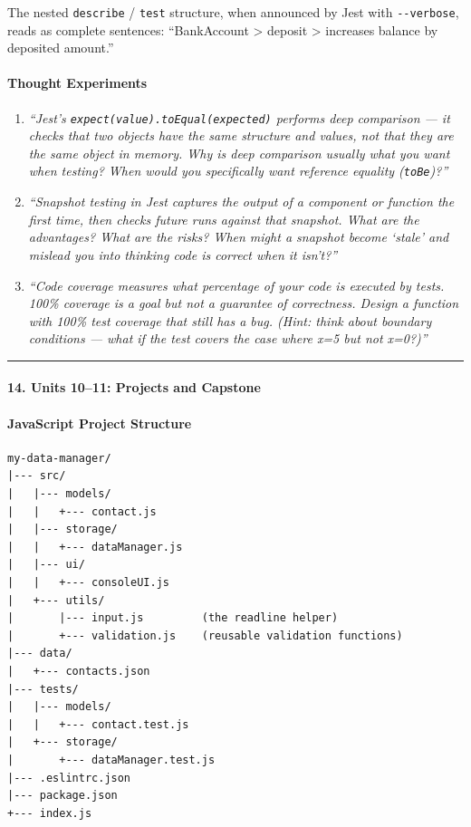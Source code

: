 \documentclass[
  justified,
  openright,
]{tufte-book}
\let\subsection\paragraph
\let\paragraph\paragraph
\let\subsection\paragraph
\let\paragraph\paragraph
\begin{document}
The nested \texttt{describe} / \texttt{test} structure, when announced
by Jest with \texttt{-\/-verbose}, reads as complete sentences:
``BankAccount \textgreater{} deposit \textgreater{} increases balance by
deposited amount.''

\paragraph{Thought Experiments}\label{thought-experiments-28}

\begin{enumerate}
\def\labelenumi{\arabic{enumi}.}
\item
  \emph{``Jest's \texttt{expect(value).toEqual(expected)} performs deep
  comparison --- it checks that two objects have the same structure and
  values, not that they are the same object in memory. Why is deep
  comparison usually what you want when testing? When would you
  specifically want reference equality (\texttt{toBe})?''}
\item
  \emph{``Snapshot testing in Jest captures the output of a component or
  function the first time, then checks future runs against that
  snapshot. What are the advantages? What are the risks? When might a
  snapshot become `stale' and mislead you into thinking code is correct
  when it isn't?''}
\item
  \emph{``Code coverage measures what percentage of your code is
  executed by tests. 100\% coverage is a goal but not a guarantee of
  correctness. Design a function with 100\% test coverage that still has
  a bug. (Hint: think about boundary conditions --- what if the test
  covers the case where x=5 but not x=0?)''}
\end{enumerate}

\begin{center}\rule{0.5\linewidth}{0.5pt}\end{center}

\subsection{14. Units 10--11: Projects and
Capstone}\label{units-1011-projects-and-capstone}

\subsection{JavaScript Project
Structure}\label{javascript-project-structure}

\begin{verbatim}
my-data-manager/
|--- src/
|   |--- models/
|   |   +--- contact.js
|   |--- storage/
|   |   +--- dataManager.js
|   |--- ui/
|   |   +--- consoleUI.js
|   +--- utils/
|       |--- input.js         (the readline helper)
|       +--- validation.js    (reusable validation functions)
|--- data/
|   +--- contacts.json
|--- tests/
|   |--- models/
|   |   +--- contact.test.js
|   +--- storage/
|       +--- dataManager.test.js
|--- .eslintrc.json
|--- package.json
+--- index.js
\end{verbatim}
\end{document}
